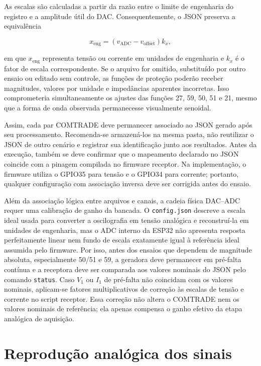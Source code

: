 As escalas são calculadas a partir da razão entre o limite de engenharia do registro e a amplitude útil do DAC. Consequentemente, o JSON preserva a equivalência

\begin{equation}
  x_{\mathrm{eng}}=(v_{\mathrm{ADC}}-v_{\mathrm{offset}})k_x,
\end{equation}

em que $x_{\mathrm{eng}}$ representa tensão ou corrente em unidades de engenharia e $k_x$ é o fator de escala correspondente. Se o arquivo for omitido, substituído por outro ensaio ou editado sem controle, as funções de proteção poderão receber magnitudes, valores por unidade e impedâncias aparentes incorretas. Isso comprometeria simultaneamente os ajustes das funções 27, 59, 50, 51 e 21, mesmo que a forma de onda observada permanecesse visualmente senoidal.

Assim, cada par COMTRADE deve permanecer associado ao JSON gerado após seu processamento. Recomenda-se armazená-los na mesma pasta, não reutilizar o JSON de outro cenário e registrar sua identificação junto aos resultados. Antes da execução, também se deve confirmar que o mapeamento declarado no JSON coincide com a pinagem compilada no firmware receptor. Na implementação, o firmware  utiliza o GPIO35 para tensão e o GPIO34 para corrente; portanto, qualquer configuração com associação inversa deve ser corrigida antes do ensaio.

Além da associação lógica entre arquivos e canais, a cadeia física DAC--ADC requer uma calibração de ganho da bancada. O \texttt{config.json} descreve a escala ideal usada para converter a oscilografia em tensão analógica e reconstruí-la em unidades de engenharia, mas o ADC interno da ESP32 não apresenta resposta perfeitamente linear nem fundo de escala exatamente igual à referência ideal assumida pelo firmware. Por isso, antes dos ensaios que dependem de magnitude absoluta, especialmente 50/51 e 59, a geradora deve permanecer em pré-falta contínua e a receptora deve ser comparada aos valores nominais do JSON pelo comando \texttt{status}. Caso $V_1$ ou $I_1$ de pré-falta não coincidam com os valores nominais, aplicam-se fatores multiplicativos de correção às escalas de tensão e corrente no script receptor. Essa correção não altera o COMTRADE nem os valores nominais de referência; ela apenas compensa o ganho efetivo da etapa analógica de aquisição.

\section{Reprodução analógica dos sinais}

